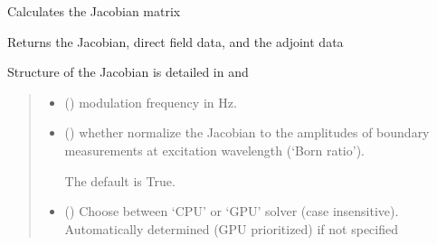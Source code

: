 \documentclass[letterpaper,10pt,english]{sphinxmanual}
\begin{document}
\begin{fulllineitems}
\begin{fulllineitems}
\label{\detokenize{_autosummary/nirfasterff.base.fluor_mesh.fluormesh:nirfasterff.base.fluor_mesh.fluormesh.jacobian}}
\pysigstartsignatures
\pysiglinewithargsret
{}
{\sphinxparamcomma {}\sphinxparamcomma {}\sphinxparamcomma {}}
{}
\pysigstopsignatures
\sphinxAtStartPar
Calculates the Jacobian matrix

\sphinxAtStartPar
Returns the Jacobian, direct field data, and the adjoint data

\sphinxAtStartPar
Structure of the Jacobian is detailed in {\hyperref[\detokenize{_autosummary/nirfasterff.inverse.jacobian_fl_CW:nirfasterff.inverse.jacobian_fl_CW}]{}} and {\hyperref[\detokenize{_autosummary/nirfasterff.inverse.jacobian_fl_FD:nirfasterff.inverse.jacobian_fl_FD}]{}}
\begin{quote}\begin{description}
\begin{itemize}
\item {} 
\sphinxAtStartPar
{} () \textendash{} modulation frequency in Hz.

\item {} 
\sphinxAtStartPar
{} (\sphinxstyleliteralemphasis{\sphinxupquote{, }}) \textendash{} 
\sphinxAtStartPar
whether normalize the Jacobian to the amplitudes of boundary measurements at excitation wavelength (‘Born ratio’).

\sphinxAtStartPar
The default is True.


\item {} 
\sphinxAtStartPar
{} (\sphinxstyleliteralemphasis{\sphinxupquote{, }}) \textendash{} Choose between ‘CPU’ or ‘GPU’ solver (case insensitive). Automatically determined (GPU prioritized) if not specified


\end{itemize}
\end{description}
\end{quote}
\end{fulllineitems}
\end{fulllineitems}
\end{document}
